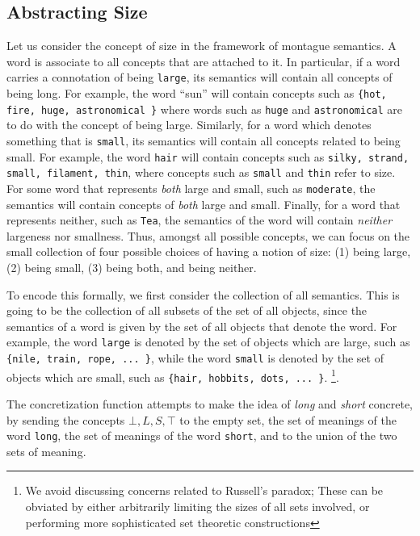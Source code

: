 \documentclass[11pt]{book}
\begin{document}
\subsection{Abstracting Size}

Let us consider the concept of size in the framework of montague semantics.  A
word is associate to all concepts that are attached to it. In particular, if a
word carries a connotation of being \texttt{large}, its semantics will contain
all concepts of being long. For example, the word ``sun'' will contain 
concepts such as \texttt{\{hot, fire, huge, astronomical \}} where words such as 
\texttt{huge} and \texttt{astronomical} are to do with the concept of being large.
Similarly, for a word which denotes something that
is \texttt{small}, its semantics will contain all concepts related to being small. For example,
the word \texttt{hair} will contain concepts such as \texttt{silky, strand, small, filament, thin},
where concepts such as \texttt{small} and \texttt{thin} refer to size.
For some word that represents \emph{both} large and small, such as \texttt{moderate},
the semantics will contain concepts of \emph{both} large and small.
Finally, for a word that represents neither, such as \texttt{Tea}, the semantics of the word
will contain \emph{neither} largeness nor smallness. Thus, amongst all possible
concepts, we can focus on the small collection of four possible choices of
having a notion of size: (1) being large, (2) being small, (3) being both, and
being neither.

To encode this formally, we first consider the collection of all semantics.
This is going to be the collection of all subsets of the set of all objects,
since the semantics of a word is given by the set of all  objects that denote the word.
For example, the word \texttt{large} is denoted by the set of objects which are large,
such as \texttt{\{nile, train, rope, ... \}},
while the word \texttt{small} is denoted by the set of objects which are small,
such as \texttt{\{hair, hobbits, dots, ... \}}.
\footnote{We avoid discussing concerns related 
to Russell's paradox; These can be obviated by either arbitrarily limiting the sizes of all sets
involved, or performing more sophisticated set theoretic constructions}.

The concretization function attempts to make the idea of \emph{long} and
\emph{short} concrete, by sending the concepts $\bot, L, S, \top$ to the empty
set, the set of meanings of the word \texttt{long}, the set of meanings of the word 
\texttt{short}, and to the union of the two sets of meaning.
\end{document}
